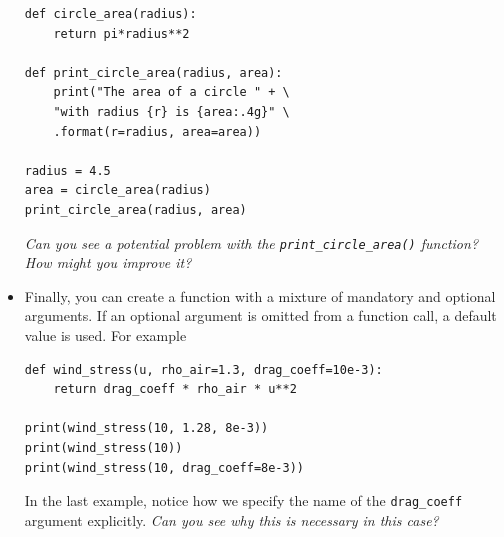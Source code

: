 \documentclass[a4paper,twoside]{memoir}
\newcommand{\shellcmd}{\texttt}
\begin{document}
\begin{itemize}
\begin{verbatim}
def circle_area(radius):
	return pi*radius**2

def print_circle_area(radius, area):
	print("The area of a circle " + \
	"with radius {r} is {area:.4g}" \
	.format(r=radius, area=area))

radius = 4.5
area = circle_area(radius)
print_circle_area(radius, area)
\end{verbatim}
\textit{Can you see a potential problem with the \texttt{print\_circle\_area()} function?  How might you improve it?}
\item Finally, you can create a function with a mixture of mandatory and optional arguments.  If an optional argument is omitted from a function call, a default value is used.  For example
\begin{verbatim}
def wind_stress(u, rho_air=1.3, drag_coeff=10e-3):
	return drag_coeff * rho_air * u**2

print(wind_stress(10, 1.28, 8e-3))
print(wind_stress(10))
print(wind_stress(10, drag_coeff=8e-3))
\end{verbatim}
In the last example, notice how we specify the name of the \shellcmd{drag\_coeff} argument explicitly.  \textit{Can you see why this is necessary in this case?}
\end{itemize}
\end{document}
